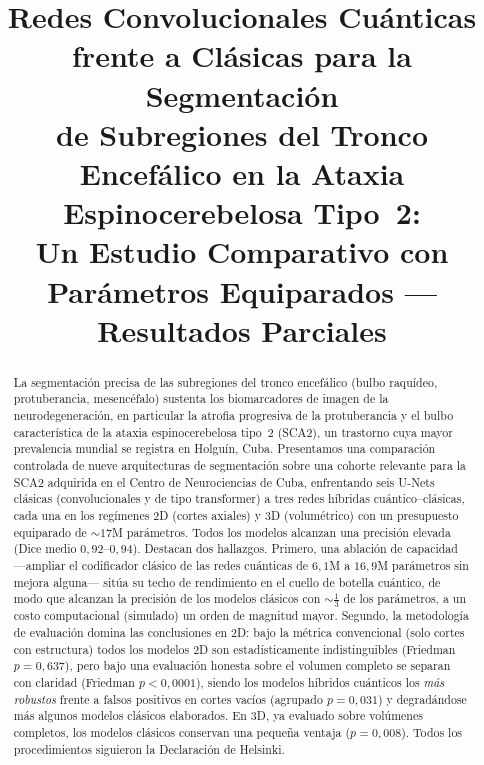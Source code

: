 \documentclass[runningheads]{llncs}
\title{Redes Convolucionales Cuánticas frente a Clásicas para la Segmentación\\
de Subregiones del Tronco Encefálico en la Ataxia Espinocerebelosa Tipo~2:\\
Un Estudio Comparativo con Parámetros Equiparados --- Resultados Parciales}
\author{}
\institute{}
\begin{document}
\maketitle

\begin{abstract}
La segmentación precisa de las subregiones del tronco encefálico (bulbo
raquídeo, protuberancia, mesencéfalo) sustenta los biomarcadores de imagen de
la neurodegeneración, en particular la atrofia progresiva de la protuberancia y
el bulbo característica de la ataxia espinocerebelosa tipo~2 (SCA2), un
trastorno cuya mayor prevalencia mundial se registra en Holguín, Cuba.
Presentamos una comparación controlada de nueve arquitecturas de segmentación
sobre una cohorte relevante para la SCA2 adquirida en el Centro de
Neurociencias de Cuba, enfrentando seis U-Nets clásicas (convolucionales y de
tipo transformer) a tres redes híbridas cuántico--clásicas, cada una en los
regímenes 2D (cortes axiales) y 3D (volumétrico) con un presupuesto equiparado
de ${\sim}17$M parámetros. Todos los modelos alcanzan una precisión elevada
(Dice medio $0{,}92$--$0{,}94$). Destacan dos hallazgos. Primero, una ablación
de capacidad ---ampliar el codificador clásico de las redes cuánticas de
$6{,}1$M a $16{,}9$M parámetros sin mejora alguna--- sitúa su techo de
rendimiento en el cuello de botella cuántico, de modo que alcanzan la precisión
de los modelos clásicos con ${\sim}\tfrac{1}{3}$ de los parámetros, a un costo
computacional (simulado) un orden de magnitud mayor. Segundo, la metodología de
evaluación domina las conclusiones en 2D: bajo la métrica convencional
(solo cortes con estructura) todos los modelos 2D son estadísticamente
indistinguibles (Friedman $p{=}0{,}637$), pero bajo una evaluación honesta sobre
el volumen completo se separan con claridad (Friedman $p{<}0{,}0001$), siendo
los modelos híbridos cuánticos los \emph{más robustos} frente a falsos
positivos en cortes vacíos (agrupado $p{=}0{,}031$) y degradándose más algunos
modelos clásicos elaborados. En 3D, ya evaluado sobre volúmenes completos, los
modelos clásicos conservan una pequeña ventaja ($p{=}0{,}008$). Todos los
procedimientos siguieron la Declaración de Helsinki.
\end{abstract}

\end{document}
